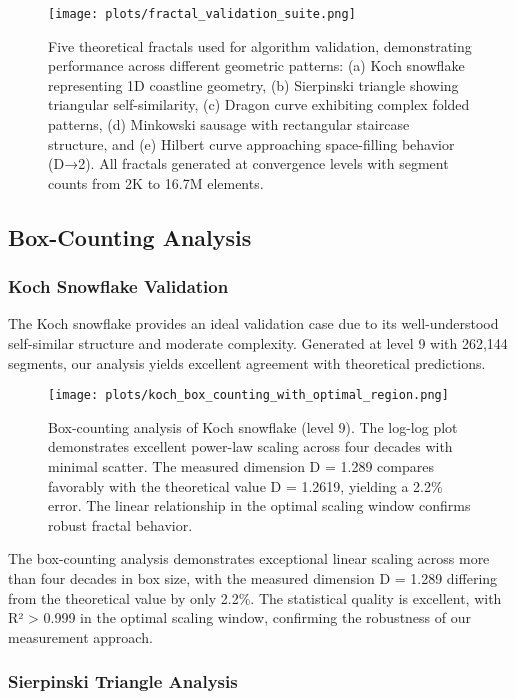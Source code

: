 \documentclass[preprint,12pt]{elsarticle}
\begin{document}
\begin{figure}[ht]
\centering
\texttt{[image: plots/fractal\_validation\_suite.png]}
\caption{Five theoretical fractals used for algorithm validation, demonstrating performance across different geometric patterns: (a) Koch snowflake representing 1D coastline geometry, (b) Sierpinski triangle showing triangular self-similarity, (c) Dragon curve exhibiting complex folded patterns, (d) Minkowski sausage with rectangular staircase structure, and (e) Hilbert curve approaching space-filling behavior (D→2). All fractals generated at convergence levels with segment counts from 2K to 16.7M elements.}
\label{fig:five_fractals}
\end{figure}

\subsection{Box-Counting Analysis}

\subsubsection{Koch Snowflake Validation}

The Koch snowflake provides an ideal validation case due to its well-understood self-similar structure and moderate complexity. Generated at level 9 with 262,144 segments, our analysis yields excellent agreement with theoretical predictions.

\begin{figure}[ht]
\centering
\texttt{[image: plots/koch\_box\_counting\_with\_optimal\_region.png]}
\caption{Box-counting analysis of Koch snowflake (level 9). The log-log plot demonstrates excellent power-law scaling across four decades with minimal scatter. The measured dimension D = 1.289 compares favorably with the theoretical value D = 1.2619, yielding a 2.2\% error. The linear relationship in the optimal scaling window confirms robust fractal behavior.}
\label{fig:koch_boxcounting}
\end{figure}

The box-counting analysis demonstrates exceptional linear scaling across more than four decades in box size, with the measured dimension D = 1.289 differing from the theoretical value by only 2.2\%. The statistical quality is excellent, with R² > 0.999 in the optimal scaling window, confirming the robustness of our measurement approach.

\subsubsection{Sierpinski Triangle Analysis}
\end{document}
